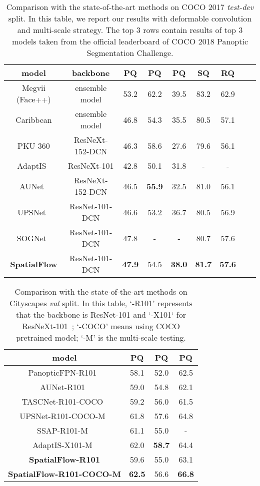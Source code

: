 \documentclass[journal,final]{IEEEtran}
\begin{document}
 \begin{table*}
  \centering
    \caption{Comparison with the state-of-the-art methods on COCO 2017 {\em test-dev} split. In this table, we report our results with deformable convolution and multi-scale strategy. The top 3 rows contain results of top 3 models taken from the official leaderboard of COCO 2018 Panoptic Segmentation Challenge.}
  \begin{tabular}{ccccccccc}
    \toprule
    model & backbone & PQ & PQ & PQ & SQ & RQ \\
    \midrule
    \midrule
    Megvii (Face++) & ensemble model & 53.2 & 62.2 & 39.5 & 83.2 & 62.9 \\
    Caribbean & ensemble model & 46.8 & 54.3 & 35.5 & 80.5 & 57.1\\
    PKU 360 & ResNeXt-152-DCN & 46.3 & 58.6 & 27.6 & 79.6 & 56.1 \\
    \midrule
    AdaptIS~\cite{adaptis} & ResNeXt-101 & 42.8 & 50.1 & 31.8 & - & - \\
    AUNet~\cite{aunet} & ResNeXt-152-DCN &  46.5  & \textbf{55.9} & 32.5 & 81.0 & 56.1\\
    UPSNet~\cite{upsnet} & ResNet-101-DCN &  46.6 & 53.2 & 36.7 & 80.5 & 56.9 \\
    SOGNet~\cite{sognet} & ResNet-101-DCN & 47.8 & - & - & 80.7 & 57.6 \\
    \textbf{SpatialFlow} & ResNet-101-DCN &  \textbf{47.9} & 54.5 & \textbf{38.0} & \textbf{81.7} & \textbf{57.6}\\
    \bottomrule
  \end{tabular}
  \label{tab3}
\end{table*}
\begin{table}
  \centering
  \caption{Comparison with the state-of-the-art methods on Cityscapes {\em val} split. In this table, `-R101' represents that the backbone is ResNet-101 and `-X101` for ResNeXt-101~\cite{resnext}; `-COCO' means using COCO pretrained model; `-M' is the multi-scale testing. }
  \begin{tabular}{cccc}
    \toprule
    model & PQ & PQ & PQ \\
    \midrule
    \midrule
    PanopticFPN-R101~\cite{panopticfpn} & 58.1 & 52.0 & 62.5 \\
    AUNet-R101~\cite{aunet} & 59.0 & 54.8 & 62.1 \\
    TASCNet-R101-COCO~\cite{tascnet} & 59.2 & 56.0 & 61.5 \\
    UPSNet-R101-COCO-M~\cite{upsnet} & 61.8 & 57.6 & 64.8 \\
    SSAP-R101-M~\cite{ssap} & 61.1 & 55.0 & - \\
    AdaptIS-X101-M~\cite{adaptis} & 62.0 & \textbf{58.7} & 64.4 \\
    \textbf{SpatialFlow-R101} & 59.6 & 55.0 & 63.1 \\
    \textbf{SpatialFlow-R101-COCO-M} & \textbf{62.5} & 56.6 & \textbf{66.8} \\
    \bottomrule
  \end{tabular}
  \label{tab4}
\end{table}
\end{document}

